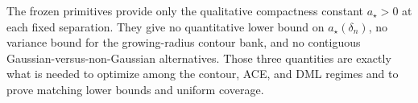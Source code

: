 The frozen primitives provide only the qualitative compactness constant \(a_{\star}>0\) at each fixed separation.  They give no quantitative lower bound on \(a_{\star}(\delta_n)\), no variance bound for the growing-radius contour bank, and no contiguous Gaussian-versus-non-Gaussian alternatives.  Those three quantities are exactly what is needed to optimize among the contour, ACE, and DML regimes and to prove matching lower bounds and uniform coverage.